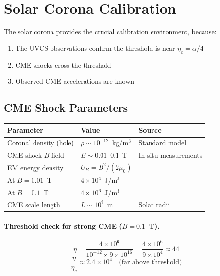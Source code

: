 \documentclass[12pt,a4paper]{article}
\begin{document}
\section{Solar Corona Calibration}
\label{sec:corona}

The solar corona provides the crucial calibration environment, because:
\begin{enumerate}
\item The UVCS observations confirm the threshold is near $\eta_c = \alpha/4$
\item CME shocks cross the threshold
\item Observed CME accelerations are known
\end{enumerate}

\subsection{CME Shock Parameters}

\begin{center}
\begin{tabular}{lll}
\toprule
Parameter & Value & Source \\
\midrule
Coronal density (hole) & $\rho \sim 10^{-12}$~kg/m$^3$ & Standard model \\
CME shock $B$ field & $B \sim 0.01$--0.1~T & In-situ measurements \\
EM energy density & $U_B = B^2/(2\mu_0)$ & \\
\quad At $B = 0.01$~T & $4 \times 10^4$~J/m$^3$ & \\
\quad At $B = 0.1$~T & $4 \times 10^6$~J/m$^3$ & \\
CME scale length & $L \sim 10^9$~m & Solar radii \\
\bottomrule
\end{tabular}
\end{center}

\paragraph{Threshold check for strong CME ($B = 0.1$~T).}
\begin{equation}
\eta = \frac{4 \times 10^6}{10^{-12} \times 9 \times 10^{16}} = \frac{4 \times 10^6}{9 \times 10^4} \approx 44
\end{equation}
\begin{equation}
\frac{\eta}{\eta_c} \approx 2.4 \times 10^4 \quad \text{(far above threshold)}
\end{equation}
\end{document}
